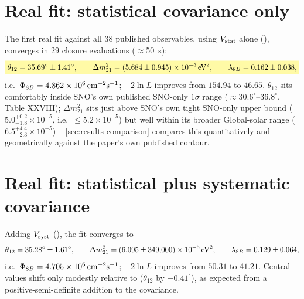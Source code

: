 \section{Real fit: statistical covariance only}
\label{sec:results-fit-stat}

\begin{resultbox}
The first real fit against all 38 published observables, using
$V_{\rm stat}$ alone (), converges in 29
closure evaluations ($\approx$50~s):
\begin{equation}
  \keyresult{\theta_{12} = 35.69^\circ \pm 1.41^\circ, \qquad
    \Delta m^2_{21} = (5.684\pm0.945)\times10^{-5}\,{\rm eV}^2, \qquad
    \lambda_{8B} = 0.162\pm0.038,}
  \label{eq:result-vstat-fit}
\end{equation}
i.e.\ $\Phi_{8B}=4.862\times10^6\,{\rm cm^{-2}s^{-1}}$; $-2\ln L$ improves
from $154.94$ to $46.65$. $\theta_{12}$ sits comfortably inside SNO's own
published SNO-only $1\sigma$ range ($\approx30.6^\circ$--$36.8^\circ$,
Table XXVIII); $\Delta m^2_{21}$ sits just above SNO's own tight SNO-only
upper bound ($5.0^{+0.2}_{-1.8}\times10^{-5}$, i.e.\ $\le5.2\times10^{-5}$)
but well within its broader Global-solar range
($6.5^{+4.4}_{-2.3}\times10^{-5}$) -- \cref{sec:results-comparison}
compares this quantitatively and geometrically against the paper's own
published contour.
\end{resultbox}

\section{Real fit: statistical plus systematic covariance}
\label{sec:results-fit-total}

\begin{resultbox}
Adding $V_{\rm syst}$ (), the fit converges
to
\begin{equation}
  \theta_{12} = 35.28^\circ \pm 1.61^\circ, \qquad
  \Delta m^2_{21} = (6.095\pm349{,}000)\times10^{-5}\,{\rm eV}^2, \qquad
  \lambda_{8B} = 0.129\pm0.064,
  \label{eq:result-vtotal-fit}
\end{equation}
i.e.\ $\Phi_{8B}=4.705\times10^6\,{\rm cm^{-2}s^{-1}}$; $-2\ln L$ improves
from $50.31$ to $41.21$. Central values shift only modestly relative to
 ($\theta_{12}$ by $-0.41^\circ$), as
expected from a positive-semi-definite addition to the covariance.
\end{resultbox}

